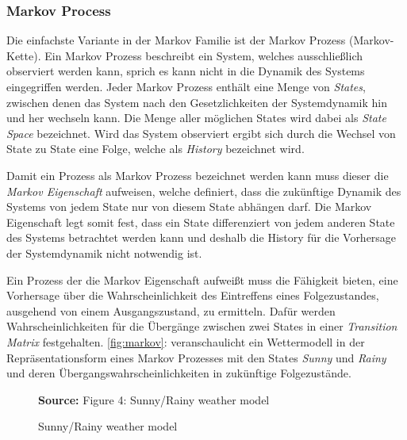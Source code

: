 \documentclass[11pt]{scrartcl}
\newcommand{\source}[1]{\vspace{-5pt} \caption*{\hfill \textbf{Source:} {#1}} }
\begin{document}
\subsubsection{Markov Process}
Die einfachste Variante in der Markov Familie ist der Markov Prozess (Markov-Kette). Ein Markov Prozess
beschreibt ein System, welches ausschließlich observiert werden kann, sprich es kann nicht in die Dynamik
des Systems eingegriffen werden. Jeder Markov Prozess enthält eine Menge von \textit{States}, zwischen
denen das System nach den Gesetzlichkeiten der Systemdynamik hin und her wechseln kann. Die Menge aller
möglichen States wird dabei als \textit{State Space} bezeichnet. Wird das System observiert ergibt sich
durch die Wechsel von State zu State eine Folge, welche als \textit{History} bezeichnet wird. 

Damit ein Prozess als Markov Prozess bezeichnet werden kann muss dieser die \textit{Markov Eigenschaft}
aufweisen, welche definiert, dass die zukünftige Dynamik des Systems von jedem State nur von diesem State abhängen darf. Die Markov Eigenschaft legt somit fest, dass ein State differenziert von jedem anderen State 
des Systems betrachtet werden kann und deshalb die History für die Vorhersage der Systemdynamik nicht
notwendig ist.

Ein Prozess der die Markov Eigenschaft aufweißt muss die Fähigkeit bieten, eine Vorhersage über
die Wahrscheinlichkeit des Eintreffens eines Folgezustandes, ausgehend von einem Ausgangszustand, zu 
ermitteln. Dafür werden Wahrscheinlichkeiten für die Übergänge zwischen zwei States in einer 
\textit{Transition Matrix} festgehalten. \autoref{fig:markov}:  veranschaulicht
ein Wettermodell in der Repräsentationsform eines Markov Prozesses mit den States \textit{Sunny} und
\textit{Rainy} und deren Übergangswahrscheinlichkeiten in zukünftige Folgezustände.

\begin{figure}[htp]
\centering
\caption{Sunny/Rainy weather model}
\source{Figure 4: Sunny/Rainy weather model \cite[~S.13]{L2018}}
\label{fig:markov}
\end{figure}
\end{document}
